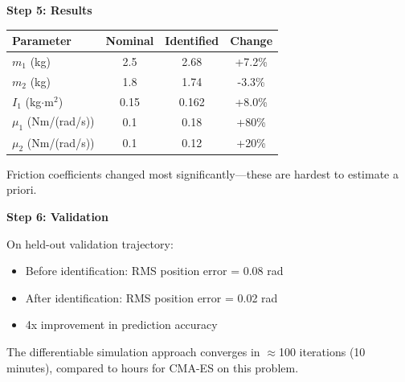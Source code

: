 \begin{example}
\textbf{Step 5: Results}

\begin{center}
\begin{tabular}{lccc}
\toprule
\textbf{Parameter} & \textbf{Nominal} & \textbf{Identified} & \textbf{Change} \\
\midrule
$m_1$ (kg) & 2.5 & 2.68 & +7.2\% \\
$m_2$ (kg) & 1.8 & 1.74 & -3.3\% \\
$I_1$ (kg$\cdot$m$^2$) & 0.15 & 0.162 & +8.0\% \\
$\mu_1$ (Nm/(rad/s)) & 0.1 & 0.18 & +80\% \\
$\mu_2$ (Nm/(rad/s)) & 0.1 & 0.12 & +20\% \\
\bottomrule
\end{tabular}
\end{center}

Friction coefficients changed most significantly---these are hardest to estimate a priori.

\textbf{Step 6: Validation}

On held-out validation trajectory:
\begin{itemize}
    \item Before identification: RMS position error = 0.08 rad
    \item After identification: RMS position error = 0.02 rad
    \item 4x improvement in prediction accuracy
\end{itemize}

The differentiable simulation approach converges in $\approx$100 iterations (10 minutes), compared to hours for CMA-ES on this problem.
\end{example}

